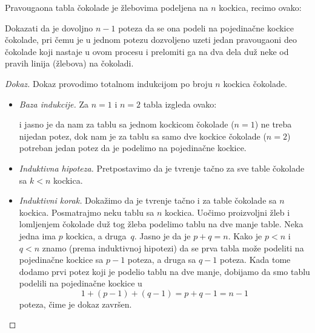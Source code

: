 \clearpage

\begin{EX}
  Pravougaona tabla \v cokolade je \v zlebovima podeljena na $n$ kockica, recimo ovako:
    \begin{center}
      
    \end{center}
  Dokazati da je dovoljno $n - 1$ poteza da se ona
  podeli na pojedina\v cne kockice \v cokolade, pri \v cemu je u jednom potezu dozvoljeno uzeti jedan
  pravougaoni deo \v cokolade koji nastaje u ovom procesu i prelomiti ga na dva dela du\v z neke od
  pravih linija (\v zlebova) na \v cokoladi.
\end{EX}
\begin{proof}[Dokaz]
  Dokaz provodimo totalnom indukcijom po broju $n$ kockica \v cokolade.
  \begin{itemize}
  \item
    \emph{Baza indukcije.} Za $n = 1$ i $n = 2$ tabla izgleda ovako:
    \begin{center}
      
    \end{center}
    i jasno je da nam za tablu sa jednom kockicom \v cokolade ($n = 1$) ne treba nijedan potez,
    dok nam je za tablu sa samo dve kockice \v cokolade ($n = 2$) potreban jedan potez da je podelimo na pojedina\v cne kockice.
  \item
    \emph{Induktivna hipoteza.} Pretpostavimo da je tvr\dj enje ta\v cno za sve table \v cokolade sa $k < n$ kockica.
  \item
    \emph{Induktivni korak.} Doka\v zimo da je tvr\dj enje ta\v cno i za table \v cokolade sa $n$ kockica.
    Posmatrajmo neku tablu sa $n$ kockica.
    Uo\v cimo proizvoljni \v zleb i lomljenjem \v cokolade du\v z tog \v zleba podelimo tablu na dve manje table. Neka jedna ima
    $p$ kockica, a druga~$q$. Jasno je da je $p + q = n$. Kako je $p < n$ i $q < n$ znamo (prema induktivnoj hipotezi)
    da se prva tabla mo\v ze podeliti na pojedina\v cne kockice sa $p - 1$ poteza, a druga sa $q - 1$ poteza. Kada tome
    dodamo prvi potez koji je podelio tablu na dve manje, dobijamo da smo tablu podelili na pojedina\v cne kockice u
    $$
      1 + (p - 1) + (q - 1) = p + q - 1 = n - 1
    $$
    poteza, \v cime je dokaz zavr\v sen.\qedhere
  \end{itemize}
\end{proof}

